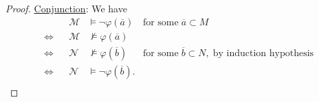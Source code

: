 \documentclass{article}
\begin{document}
\begin{enumerate}[label={\bf Q\arabic*:}]
\begin{proof}
      \underline{Conjunction}: We have
      \begin{align*}
                    && \mathcal{M}
                    & \models\neg\varphi(\overline{a})
                    & \text{for some}\; \overline{a}\subset M \\
        \Leftrightarrow && \mathcal{M}
                    & \not\models\varphi(\overline{a}) & \\
        \Leftrightarrow && \mathcal{N}
                    & \not\models\varphi(\overline{b})
                    & \text{for some}\; \overline{b}\subset N,\; \text{by
                      induction hypothesis} \\
        \Leftrightarrow && \mathcal{N}
                    & \models\neg\varphi(\overline{b}). & \\
      \end{align*}
    \end{proof}
\end{enumerate}
\end{document}
